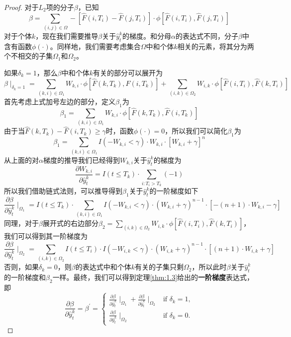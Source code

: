 \begin{proof}
对于$L_2$项的分子$\beta$，已知$$\beta = \sum_{(i,j)\in \Omega} -\left[\hat{F}(i, T_i) - \hat{F}(j, T_i)\right] \cdot \phi\left[ \hat{F}(i, T_i), \hat{F}(j, T_i) \right]$$ 对于个体$k$，现在我们需要推导$\beta$关于$\hat{y}_t^k$的梯度。和分母$\alpha$的表达式不同，分子$\beta$中含有函数$\phi(\cdot)$。同样地，我们需要考虑集合$\Omega$中和个体$k$相关的元素，将其分为两个不相交的子集$\Omega_1$和$\Omega_2$。

如果$\delta_k = 1$，那么$\beta$中和个体$k$有关的部分可以展开为$$\beta \mid_{\delta_k=1}=\sum_{(k,i)\in \Omega_1} W_{k,i}\cdot \phi\left[ \hat{F}(k, T_k), \hat{F}(i, T_k) \right] + \sum_{(i,k)\in \Omega_2} W_{i,k}\cdot \phi\left[ \hat{F}(i, T_i), \hat{F}(k, T_i) \right] $$ 首先考虑上式加号左边的部分，定义$\beta_1$为$$\beta_1 = \sum_{(k,i)\in \Omega_1} W_{k,i}\cdot \phi\left[ \hat{F}(k, T_k), \hat{F}(i, T_k) \right]$$ 由于当$\hat{F}(k, T_k) - \hat{F}(i, T_k) \ge \gamma$时，函数$\phi(\cdot)=0$，所以我们可以简化$\beta_1$为$$\beta_1 = \sum_{(k,i)\in \Omega_1} I(-W_{k,i} < \gamma) \cdot W_{k,i}\cdot [W_{k,i} + \gamma]^n $$ 从上面的对$\alpha$梯度的推导我们已经得到$W_{k,i}$关于$\hat{y}_t^k$的梯度为$$\frac{\partial W_{k,i}}{\partial \hat{y}_t^k} = I(t\le T_k)\cdot {\sum\limits_{i: T_i>T_k}(-1)}$$ 所以我们借助链式法则，可以推导得到$\beta_1$关于$\hat{y}_t^k$的一阶梯度如下$$
\frac{\partial \beta}{\partial \hat{y}_t^k} \mid_{\Omega_1} = I(t\le T_k)\cdot \sum\limits_{(k,i)\in \Omega_1} {I(-W_{k,i}<\gamma)\cdot (W_{k,i}+\gamma)^{n-1}\cdot [-(n+1)\cdot W_{k,i}-\gamma]}
$$ 同理，对于$\beta$展开式的右边部分$\beta_2=\sum_{(i,k)\in \Omega_2} W_{i,k}\cdot \phi\left[ \hat{F}(i, T_i), \hat{F}(k, T_i) \right]$，我们可以得到其一阶梯度为$$
\frac{\partial \beta}{\partial \hat{y}_t^k} \mid_{\Omega_2} = \sum\limits_{(i,k)\in \Omega_2} {I(t\le T_i)\cdot I(-W_{i,k}<\gamma)\cdot (W_{i,k}+\gamma)^{n-1}\cdot [(n+1)\cdot W_{i,k}+\gamma]}
$$ 否则，如果$\delta_k = 0$，则$\beta$的表达式中和个体$k$有关的子集只剩$\Omega_2$，所以此时$\beta$关于$\hat{y}_t^k$的一阶梯度和$\beta_2$一样。最终，我们可以得到定理\ref{thm:1.3}给出的\textbf{一阶梯度}表达式，即$$
\frac{\partial \beta}{\partial \hat{y}_t^k}=\beta^{'}=
\begin{cases}
\frac{\partial \beta}{\partial \hat{y}_t^k} \mid_{\Omega_1} + \frac{\partial \beta}{\partial \hat{y}_t^k} \mid_{\Omega_2} & \text{if } \delta_k = 1,\\
\frac{\partial \beta}{\partial \hat{y}_t^k} \mid_{\Omega_2} & \text{if } \delta_k = 0.
\end{cases}
$$


\end{proof}
